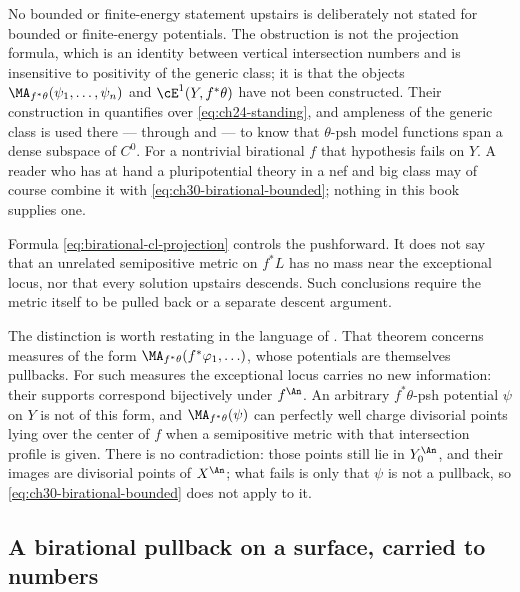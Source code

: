 \begin{warning}{No bounded or finite-energy statement upstairs}
 is deliberately not stated for
bounded or finite-energy potentials.  The obstruction is not the projection
formula, which is an identity between vertical intersection numbers and is
insensitive to positivity of the generic class; it is that the objects
\(\MA_{f^*\theta}(\psi_1,\ldots,\psi_n)\) and \(\cE^1(Y,f^*\theta)\) have
not been constructed.  Their construction in
 quantifies over
\eqref{eq:ch24-standing}, and ampleness of the generic class is used there
--- through  and
 --- to know that \(\theta\)-psh model
functions span a dense subspace of \(C^0\).  For a nontrivial birational
\(f\) that hypothesis fails on \(Y\).  A reader who has at hand a
pluripotential theory in a nef and big class may of course combine it with
\eqref{eq:ch30-birational-bounded}; nothing in this book supplies one.
\end{warning}

\begin{remark}
Formula \eqref{eq:birational-cl-projection} controls the pushforward.  It
does not say that an unrelated semipositive metric on \(f^*L\) has no mass
near the exceptional locus, nor that every solution upstairs descends.
Such conclusions require the metric itself to be pulled back or a separate
descent argument.

The distinction is worth restating in the language of
.  That theorem concerns measures
of the form \(\MA_{f^*\theta}(f^*\varphi_1,\ldots)\), whose potentials are
themselves pullbacks.  For such measures the exceptional locus carries no
new information: their supports correspond bijectively under \(f^{\An}\).
An arbitrary \(f^*\theta\)-psh potential \(\psi\) on \(Y\) is not of this
form, and \(\MA_{f^*\theta}(\psi)\) can perfectly well charge divisorial
points lying over the center of \(f\) when a semipositive metric with that
intersection profile is given.  There is no contradiction: those points still lie in
\(Y^{\An}_0\), and their images are divisorial points of \(X^{\An}\); what
fails is only that \(\psi\) is not a pullback, so
\eqref{eq:ch30-birational-bounded} does not apply to it.
\end{remark}

\subsection{A birational pullback on a surface, carried to numbers}
\label{sec:ch30-birational-example}

